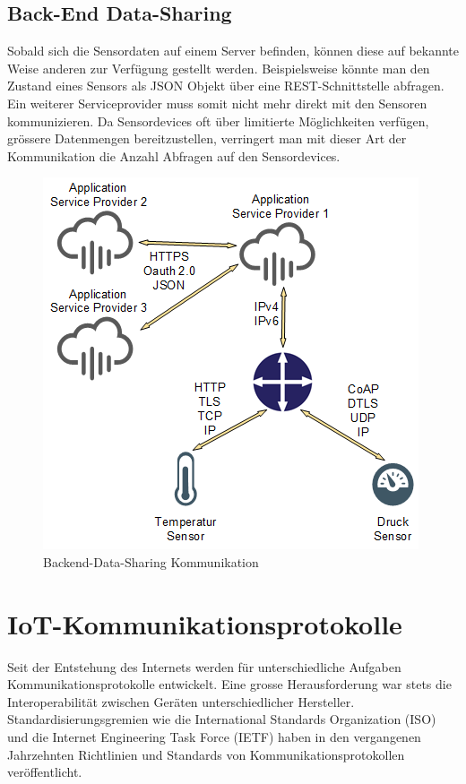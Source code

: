 \subsection{Back-End Data-Sharing}
Sobald sich die Sensordaten auf einem Server befinden, können diese auf bekannte Weise anderen zur Verfügung gestellt werden. Beispielsweise könnte man den Zustand eines Sensors als JSON Objekt über eine REST-Schnittstelle abfragen. Ein weiterer Serviceprovider muss somit nicht mehr direkt mit den Sensoren kommunizieren. Da Sensordevices oft über limitierte Möglichkeiten verfügen, grössere Datenmengen bereitzustellen, verringert man mit dieser Art der Kommunikation die Anzahl Abfragen auf den Sensordevices. 
\begin{figure}[H]
\centering
\includegraphics[scale=0.7]{../02_Analyse/images/backend-data-sharing.png}
\caption{Backend-Data-Sharing Kommunikation}
\end{figure}

\newpage

\section{IoT-Kommunikationsprotokolle}
Seit der Entstehung des Internets werden für unterschiedliche Aufgaben Kommunikationsprotokolle entwickelt. Eine grosse Herausforderung war stets die Interoperabilität zwischen Geräten unterschiedlicher Hersteller. Standardisierungsgremien wie die International Standards Organization (ISO) und die Internet Engineering Task Force (IETF) haben in den vergangenen Jahrzehnten Richtlinien und Standards von Kommunikationsprotokollen veröffentlicht. 

